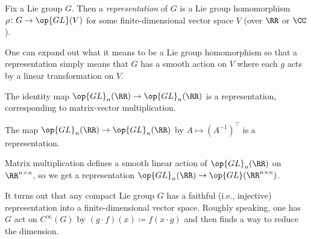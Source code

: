 \documentclass[../notes.tex]{subfiles}
\begin{document}
\begin{definition}
	Fix a Lie group $G$. Then a \textit{representation} of $G$ is a Lie group homomorphism $\rho\colon G\to\op{GL}(V)$ for some finite-dimensional vector space $V$ (over $\RR$ or $\CC$).
\end{definition}
\begin{remark}
	One can expand out what it means to be a Lie group homomorphism so that a representation simply means that $G$ has a smooth action on $V$ where each $g$ acts by a linear transformation on $V$.
\end{remark}
\begin{example}
	The identity map $\op{GL}_n(\RR)\to\op{GL}_n(\RR)$ is a representation, corresponding to matrix-vector multiplication.
\end{example}
\begin{example}
	The map $\op{GL}_n(\RR)\to\op{GL}_n(\RR)$ by $A\mapsto\left(A^{-1}\right)^\intercal$ is a representation.
\end{example}
\begin{example}
	Matrix multiplication defines a smooth linear action of $\op{GL}_n(\RR)$ on $\RR^{n\times n}$, so we get a representation $\op{GL}_n(\RR)\to\op{GL}(\RR^{n\times n})$.
\end{example}
\begin{remark}
	It turns out that any compact Lie group $G$ has a faithful (i.e., injective) representation into a finite-dimensional vector space. Roughly speaking, one has $G$ act on $C^\infty(G)$ by $(g\cdot f)(x)\coloneqq f(x\cdot g)$ and then finds a way to reduce the dimension.
\end{remark}
\end{document}
